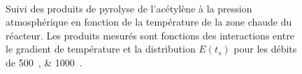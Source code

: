 \begin{figure}[!ht]
  \centering
  \\
  
  \caption{\label{fig:acetylene_pyrolysis}Suivi des produits de pyrolyse de l'acétylène à la pression atmosphérique en fonction de la température de la zone chaude du réacteur. Les produits mesurés sont fonctions des interactions entre le gradient de température et la distribution $E(t_{s})$ pour les débits de \SIlist{500;1000}{\sccm}.}
\end{figure}

